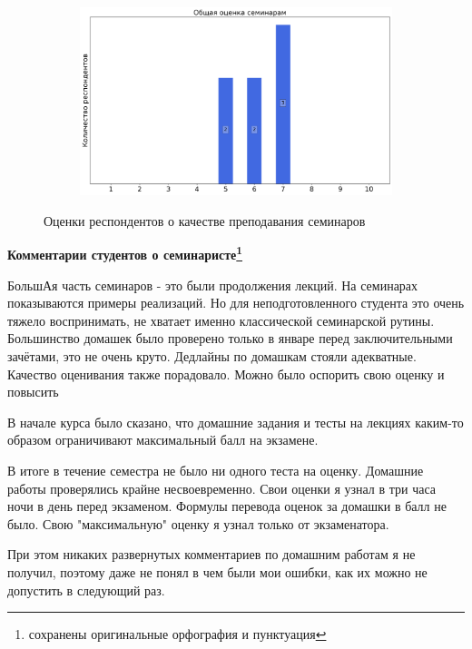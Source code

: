 \begin{figure}[H]
\begin{subfigure}[b]{0.45\textwidth}
			\end{subfigure}
			\begin{subfigure}[b]{0.45\textwidth}
				\centering
				\includegraphics[width=\textwidth]{images/4 course/Введение в машинное обучение/seminarists-marks-Нейчев Р.Г.-3.png}
			\end{subfigure}	
			\caption{Оценки респондентов о качестве преподавания семинаров}
		\end{figure}

		\textbf{Комментарии студентов о семинаристе\protect\footnote{сохранены оригинальные орфография и пунктуация}}
            \begin{commentbox} 
                БольшАя часть семинаров - это были продолжения лекций. На семинарах показываются примеры реализаций. Но для неподготовленного студента это очень тяжело воспринимать, не хватает именно классической семинарской рутины. Большинство домашек было проверено только в январе перед заключительными зачётами, это не очень круто. Дедлайны по домашкам стояли адекватные. Качество оценивания также порадовало. Можно было оспорить свою оценку и повысить 
            \end{commentbox} 
        
            \begin{commentbox} 
                В начале курса было сказано, что домашние задания и тесты на лекциях каким-то образом ограничивают максимальный балл на экзамене. 
        
                В итоге в течение семестра не было ни одного теста на оценку. Домашние работы проверялись крайне несвоевременно. Свои оценки я узнал в три часа ночи в день перед экзаменом. Формулы перевода оценок за домашки в балл не было. Свою "максимальную" оценку я узнал только от экзаменатора.
        
                При этом никаких развернутых комментариев по домашним работам я не получил, поэтому даже не понял в чем были мои ошибки, как их можно не допустить в следующий раз. 
            \end{commentbox} 
        
